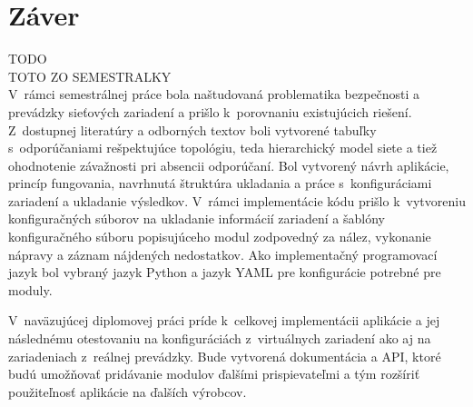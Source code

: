 \chapter*{Záver}
{}

TODO \\
TOTO ZO SEMESTRALKY\\

V~rámci semestrálnej práce bola naštudovaná problematika bezpečnosti a prevádzky sieťových zariadení a prišlo k~porovnaniu existujúcich riešení. Z~dostupnej literatúry a odborných textov boli vytvorené tabuľky s~odporúčaniami rešpektujúce topológiu, teda hierarchický model siete a tiež ohodnotenie závažnosti pri absencii odporúčaní. Bol vytvorený návrh aplikácie, princíp fungovania, navrhnutá štruktúra ukladania a práce s~konfiguráciami zariadení a ukladanie výsledkov. V~rámci implementácie kódu prišlo k~vytvoreniu konfiguračných súborov na ukladanie informácií zariadení a šablóny konfiguračného súboru popisujúceho modul zodpovedný za nález, vykonanie nápravy a záznam nájdených nedostatkov. Ako implementačný programovací jazyk bol vybraný jazyk Python a jazyk YAML pre konfigurácie potrebné pre moduly.

V~naväzujúcej diplomovej práci príde k~celkovej implementácii aplikácie a jej následnému otestovaniu na konfiguráciách z~virtuálnych zariadení ako aj na zariadeniach z~reálnej prevádzky. Bude vytvorená dokumentácia a API, ktoré budú umožňovať pridávanie modulov ďalšími prispievateľmi a tým rozšíriť použiteľnosť aplikácie na ďalších výrobcov. 
